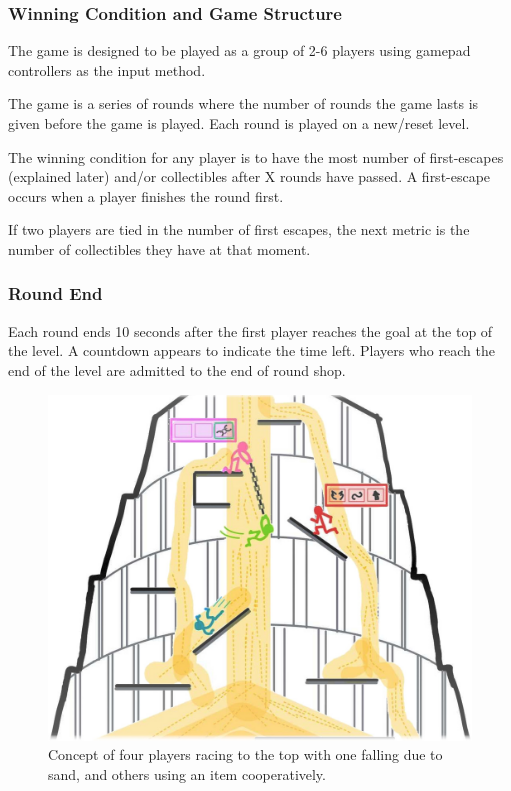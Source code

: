 \subsubsection{Winning Condition and Game Structure}

The game is designed to be played as a group of 2-6 players using gamepad controllers as the input method.

The game is a series of rounds where the number of rounds the game lasts is given before the game is played. Each round is played on a new/reset level.

The winning condition for any player is to have the most number of first-escapes (explained later) and/or collectibles after X rounds have passed. A first-escape occurs when a player finishes the round first.

If two players are tied in the number of first escapes, the next metric is the number of collectibles they have at that moment.

\subsubsection{Round End}
Each round ends 10 seconds after the first player reaches the goal at the top of the level. A countdown appears to indicate the time left. Players who reach the end of the level are admitted to the end of round shop.


\begin{figure}
    \centering
    \includegraphics{figures/topmeifyoucan_concept.jpg}
    \caption{Concept of four players racing to the top with one falling due to sand, and others using an item cooperatively.}
    \label{fig:concept}
\end{figure}

